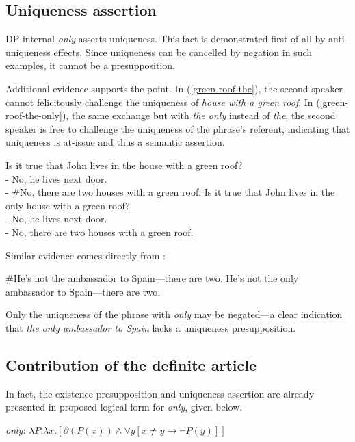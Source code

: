 \subsection{Uniqueness assertion}
DP-internal \textit{only} asserts uniqueness. This fact is demonstrated first of all by anti-uniqueness effects. Since uniqueness can be cancelled by negation in such examples, it cannot be a presupposition.

Additional evidence supports the point. In (\ref{green-roof-the}), the second speaker cannot felicitously challenge the uniqueness of \textit{house with a green roof}. In (\ref{green-roof-the-only}), the same exchange but with \textit{the only} instead of \textit{the}, the second speaker is free to challenge the uniqueness of the phrase's referent, indicating that uniqueness is at-issue and thus a semantic assertion.

\begin{exe}
	\ex \label{green-roof-the} Is it true that John lives in the house with a green roof? \\
	    - No, he lives next door. \\
	    - \#No, there are two houses with a green roof.
	\ex \label{green-roof-the-only} Is it true that John lives in the only house with a green roof? \\
	    - No, he lives next door. \\
	    - No, there are two houses with a green roof.
\end{exe}

Similar evidence comes directly from \citet{cb2015}:

\begin{exe}
	\ex \#He's not the ambassador to Spain---there are two.
	\ex He's not the only ambassador to Spain---there are two.
\end{exe}

Only the uniqueness of the phrase with \textit{only} may be negated---a clear indication that \textit{the only ambassador to Spain} lacks a uniqueness presupposition.

\subsection{Contribution of the definite article}
In fact, the existence presupposition and uniqueness assertion are already presented in  proposed logical form for \textit{only}, given below.

\begin{exe}
	\ex \textit{only}: $ \lambda P . \lambda x . [ \partial(P(x)) \land \forall y [ x \ne y \to \neg P(y) ] ] $
\end{exe}

